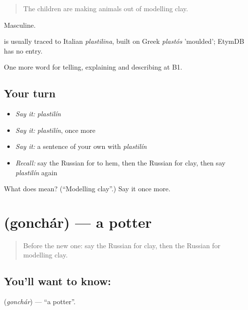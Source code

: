 \begin{quote}
The children are making animals out of modelling clay.
\end{quote}

Masculine.

\begin{cousinweb}
\emph{} is usually traced to Italian \emph{plastilina}, built on Greek \emph{plastós} 'moulded'; EtymDB has no entry.
\end{cousinweb}

\begin{grammarlens}[title={What you've built}]
One more word for telling, explaining and describing at B1.
\end{grammarlens}

\subsection*{Your turn}
\begin{itemize}
\raggedright
  \item \emph{Say it:} \emph{plastilín}
  \item \emph{Say it:} \emph{plastilín}, once more
  \item \emph{Say it:} a sentence of your own with \emph{plastilín}
  \item \emph{Recall:} say the Russian for to hem, then the Russian for clay, then say \emph{plastilín} again
\end{itemize}

\begin{tcolorbox}[breakable,colback=teal!4,colframe=teal!35!black,title={Before you move on}]
What does  mean? (\textquotedblleft{}Modelling clay\textquotedblright{}.) Say it once more.
\end{tcolorbox}
\section[\texorpdfstring{\ru{гончар} (gonchár)}{гончар (gonchár)}]{ (gonchár) — a potter}

\label{lesson:RU-C502-gonchar}



\begin{quote}
Before the new one: say the Russian for clay, then the Russian for modelling clay.
\end{quote}

\subsection*{You'll want to know: }
\textbf{} (\emph{gonchár}) — \textquotedblleft{}a potter\textquotedblright{}.

